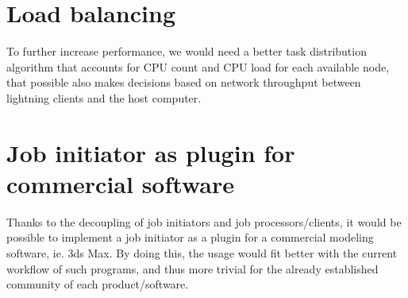 \section{Load balancing}
To further increase performance, we would need a better task distribution algorithm that accounts for CPU count and CPU load for each available node, that possible also makes decisions based on network throughput between lightning clients and the host computer.

\section{Job initiator as plugin for commercial software}
Thanks to the decoupling of job initiators and job processors/clients, it would be possible to implement a job initiator as a plugin for a commercial modeling software, ie. 3ds Max. By doing this, the usage would fit better with the current workflow of such programs, and thus more trivial for the already established community of each product/software.

